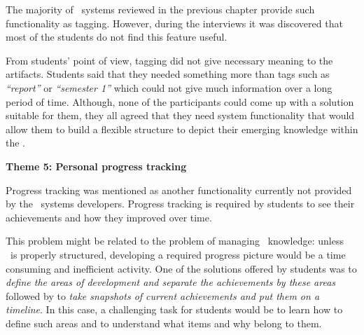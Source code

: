 
The majority of \ep~systems reviewed in the previous chapter provide such
functionality as tagging. However, during the interviews it was discovered that
most of the students do not find this feature useful.


From students' point of view, tagging did not give necessary meaning to the
artifacts. Students said that they needed something more than tags such as
\textit{``report''} or \textit{``semester 1''} which could not give much
information over a long period of time. Although, none of the participants could
come up with a solution suitable for them, they all agreed that they need system
functionality that would allow them to build a flexible structure to depict
their emerging knowledge within the \ep.

\textbf{Theme 5: Personal progress tracking}

Progress tracking was mentioned as another functionality currently not provided
by the \ep~systems developers. Progress tracking is required by students to see
their achievements and how they improved over time.


This problem might be related to the problem of managing \ep~knowledge: unless
\ep~is properly structured, developing a required progress picture would be a
time consuming and inefficient activity. One of the solutions offered by
students was to \textit{define the areas of development and separate the
achievements by these areas} followed by to \textit{take snapshots of current
achievements and put them on a timeline}. In this case, a challenging task for
students would be to learn how to define such areas and to understand what
items and why belong to them.

